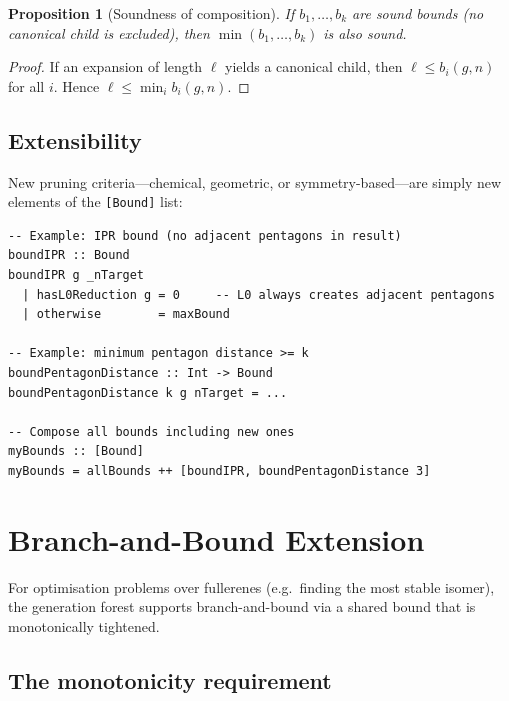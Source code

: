 \documentclass[11pt,a4paper]{article}
\newtheorem{proposition}[theorem]{Proposition}
\theoremstyle{definition}
\begin{document}
\begin{proposition}[Soundness of composition]
If $b_1, \ldots, b_k$ are sound bounds (no canonical child is
excluded), then $\min(b_1, \ldots, b_k)$ is also sound.
\end{proposition}

\begin{proof}
If an expansion of length $\ell$ yields a canonical child, then
$\ell \le b_i(g, n)$ for all $i$.  Hence
$\ell \le \min_i b_i(g, n)$.
\end{proof}

\subsection{Extensibility}

New pruning criteria---chemical, geometric, or symmetry-based---are
simply new elements of the \texttt{[Bound]} list:

\begin{lstlisting}
-- Example: IPR bound (no adjacent pentagons in result)
boundIPR :: Bound
boundIPR g _nTarget
  | hasL0Reduction g = 0     -- L0 always creates adjacent pentagons
  | otherwise        = maxBound

-- Example: minimum pentagon distance >= k
boundPentagonDistance :: Int -> Bound
boundPentagonDistance k g nTarget = ...

-- Compose all bounds including new ones
myBounds :: [Bound]
myBounds = allBounds ++ [boundIPR, boundPentagonDistance 3]
\end{lstlisting}

\section{Branch-and-Bound Extension}
\label{sec:branchbound}

For optimisation problems over fullerenes (e.g.\ finding the most
stable isomer), the generation forest supports branch-and-bound via a
shared bound that is monotonically tightened.

\subsection{The monotonicity requirement}
\end{document}
